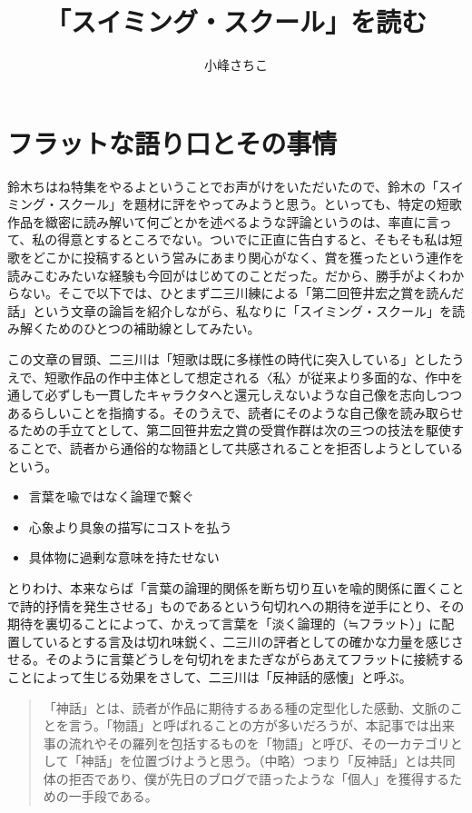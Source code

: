 \documentclass[uplatex,a4paper,oneside,landscape]{jsarticle}
\title{「スイミング・スクール」を読む}
\author{小峰さちこ}
\date{}
\begin{document}
\maketitle

\section{フラットな語り⼝とその事情}

鈴⽊ちはね特集をやるよということでお声がけをいただいたので、鈴⽊の「スイミング・スクール」を題材に評をやってみようと思う。といっても、特定の短歌作品を緻密に読み解いて何ごとかを述べるような評論というのは、率直に⾔って、私の得意とするところでない。ついでに正直に告⽩すると、そもそも私は短歌をどこかに投稿するという営みにあまり関⼼がなく、賞を獲ったという連作を読みこむみたいな経験も今回がはじめてのことだった。だから、勝⼿がよくわからない。そこで以下では、ひとまず⼆三川練による「第⼆回笹井宏之賞を読んだ話」という⽂章の論旨を紹介しながら、私なりに「スイミング・スクール」を読み解くためのひとつの補助線としてみたい。

この⽂章の冒頭、⼆三川は「短歌は既に多様性の時代に突⼊している」としたうえで、短歌作品の作中主体として想定される〈私〉が従来より多⾯的な、作中を通して必ずしも⼀貫したキャラクタへと還元しえないような⾃⼰像を志向しつつあるらしいことを指摘する。そのうえで、読者にそのような⾃⼰像を読み取らせるための⼿⽴てとして、第⼆回笹井宏之賞の受賞作群は次の三つの技法を駆使することで、読者から通俗的な物語として共感されることを拒否しようとしているという。

\begin{itemize}
\item
  ⾔葉を喩ではなく論理で繋ぐ
\item
  ⼼象より具象の描写にコストを払う
\item
  具体物に過剰な意味を持たせない
\end{itemize}

とりわけ、本来ならば「⾔葉の論理的関係を断ち切り互いを喩的関係に置くことで詩的抒情を発⽣させる」ものであるという句切れへの期待を逆⼿にとり、その期待を裏切ることによって、かえって⾔葉を「淡く論理的（≒フラット）」に配置しているとする⾔及は切れ味鋭く、⼆三川の評者としての確かな⼒量を感じさせる。そのように⾔葉どうしを句切れをまたぎながらあえてフラットに接続することによって⽣じる効果をさして、⼆三川は「反神話的感懐」と呼ぶ。

\begin{quote}
「神話」とは、読者が作品に期待するある種の定型化した感動、⽂脈のことを⾔う。「物語」と呼ばれることの⽅が多いだろうが、本記事では出来事の流れやその羅列を包括するものを「物語」と呼び、その⼀カテゴリとして「神話」を位置づけようと思う。（中略）つまり「反神話」とは共同体の拒否であり、僕が先⽇のブログで語ったような「個⼈」を獲得するための⼀⼿段である。
\end{quote}
\end{document}
